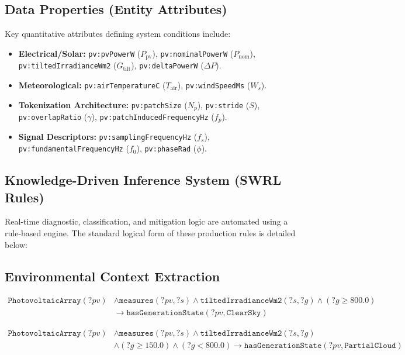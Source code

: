 \subsection{Data Properties (Entity Attributes)}
Key quantitative attributes defining system conditions include:
\begin{itemize}
    \item \textbf{Electrical/Solar:} \texttt{pv:pvPowerW} ($P_{\text{pv}}$), \texttt{pv:nominalPowerW} ($P_{\text{nom}}$), \texttt{pv:tiltedIrradianceWm2} ($G_{\text{tilt}}$), \texttt{pv:deltaPowerW} ($\Delta P$).
    \item \textbf{Meteorological:} \texttt{pv:airTemperatureC} ($T_{\text{air}}$), \texttt{pv:windSpeedMs} ($W_s$).
    \item \textbf{Tokenization Architecture:} \texttt{pv:patchSize} ($N_p$), \texttt{pv:stride} ($S$), \texttt{pv:overlapRatio} ($\gamma$), \texttt{pv:patchInducedFrequencyHz} ($f_p$).
    \item \textbf{Signal Descriptors:} \texttt{pv:samplingFrequencyHz} ($f_s$), \texttt{pv:fundamentalFrequencyHz} ($f_0$), \texttt{pv:phaseRad} ($\phi$).
\end{itemize}

\subsection{Knowledge-Driven Inference System (SWRL Rules)}
Real-time diagnostic, classification, and mitigation logic are automated using a rule-based engine. The standard logical form of these production rules is detailed below:

\subsection{Environmental Context Extraction}
\begin{equation}
\begin{aligned}
\texttt{PhotovoltaicArray}(?pv) &\wedge \texttt{measures}(?pv, ?s) \wedge \texttt{tiltedIrradianceWm2}(?s, ?g) \wedge (?g \ge 800.0) \\
&\longrightarrow \texttt{hasGenerationState}(?pv, \texttt{ClearSky})
\end{aligned}
\end{equation}

\begin{equation}
\begin{aligned}
\texttt{PhotovoltaicArray}(?pv) &\wedge \texttt{measures}(?pv, ?s) \wedge \texttt{tiltedIrradianceWm2}(?s, ?g) \\
&\wedge (?g \ge 150.0) \wedge (?g < 800.0) \longrightarrow \texttt{hasGenerationState}(?pv, \texttt{PartialCloud})
\end{aligned}
\end{equation}

